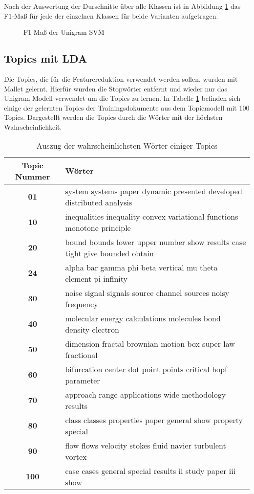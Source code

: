 Nach der Auswertung der Durschnitte über alle Klassen ist in Abbildung \ref{fig:svm_text_eval} das F1-Maß für jede der einzelnen
Klassen für beide Varianten aufgetragen.

\begin{figure}[H]
    \centering
    \def\svgwitdth{0.1\columnwidth}
    
    \caption{F1-Maß der Unigram SVM}
    \label{fig:svm_text_eval}
\end{figure}

\subsection{Topics mit LDA}
\label{sub:topics}
Die Topics, die für die Featurereduktion verwendet werden sollen, wurden mit Mallet \cite{McCallumMALLET} gelernt.
Hierfür wurden die Stopwörter entfernt und wieder nur das Unigram Modell verwendet um die Topics zu lernen.
In Tabelle \ref{tab:topics_words} befinden sich einige der gelernten Topics der Trainingsdokumente aus dem Topicmodell mit 100 Topics.
Dargestellt werden die Topics durch die Wörter mit der höchsten Wahrscheinlichkeit.

\begin{table}[h]
    \centering
    \begin{tabular}{c|l}
        \small \textbf{Topic Nummer} & \small\textbf{Wörter}\\
        \hline
        \small \textbf{01} & \small system systems paper dynamic presented developed distributed analysis\\
        \small \textbf{10} & \small inequalities inequality convex variational functions monotone principle\\
        \small \textbf{20} & \small bound bounds lower upper number show results case tight give bounded obtain \\
        \small \textbf{24} & \small alpha bar gamma phi beta vertical mu theta element pi infinity \\
        \small \textbf{30} & \small noise signal signals source channel sources noisy frequency \\
        \small \textbf{40} & \small molecular energy calculations molecules bond density electron \\
        \small \textbf{50} & \small dimension fractal brownian motion box super law fractional \\
        \small \textbf{60} & \small bifurcation center dot point points critical hopf parameter \\
        \small \textbf{70} & \small approach range applications wide methodology results \\
        \small \textbf{80} & \small class classes properties paper general show property special \\
        \small \textbf{90} & \small flow flows velocity stokes fluid navier turbulent vortex \\
        \small \textbf{100}& \small case cases general special results ii study paper iii show
    \end{tabular}
    \caption{Auszug der wahrscheinlichsten Wörter einiger Topics}
    \label{tab:topics_words}
\end{table}


